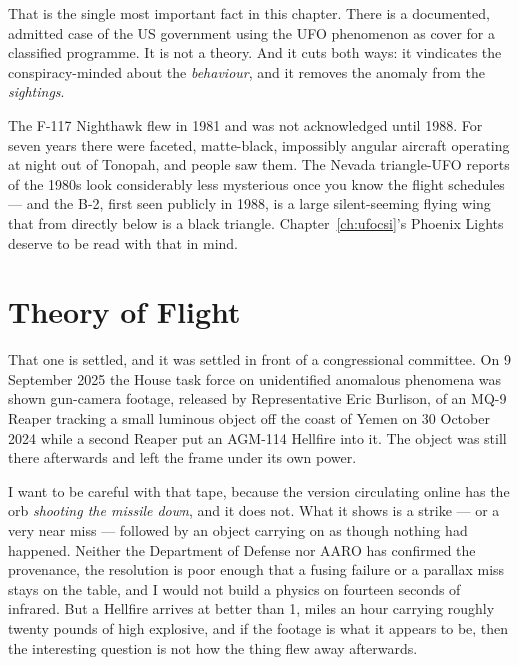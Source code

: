 That is the single most important fact in this chapter. There is a documented, admitted case of
the US government using the UFO phenomenon as cover for a classified programme. It is not a
theory. And it cuts both ways: it vindicates the conspiracy-minded about the \emph{behaviour},
and it removes the anomaly from the \emph{sightings}.

\begin{funfact}
The F-117 Nighthawk flew in 1981 and was not acknowledged until 1988. For seven years there were
faceted, matte-black, impossibly angular aircraft operating at night out of Tonopah, and people
saw them. The Nevada triangle-UFO reports of the 1980s look considerably less mysterious once you
know the flight schedules --- and the B-2, first seen publicly in 1988, is a large silent-seeming
flying wing that from directly below is a black triangle. Chapter~\ref{ch:ufocsi}'s Phoenix Lights deserve to be
read with that in mind.
\end{funfact}

\section{Theory of Flight}\label{sec:theoryflight}

 That one is settled, and
it was settled in front of a congressional committee. On 9 September 2025 the House task force on
unidentified anomalous phenomena was shown gun-camera footage, released by Representative Eric
Burlison, of an MQ-9 Reaper tracking a small luminous object off the coast of Yemen on 30 October
2024 while a second Reaper put an AGM-114 Hellfire into it. The object was still there afterwards
and left the frame under its own power.

I want to be careful with that tape, because the version circulating online has the orb
\emph{shooting the missile down}, and it does not. What it shows is a strike --- or a very near
miss --- followed by an object carrying on as though nothing had happened. Neither the Department
of Defense nor AARO has confirmed the provenance, the resolution is poor enough that a fusing
failure or a parallax miss stays on the table, and I would not build a physics on fourteen seconds
of infrared. But a Hellfire arrives at better than 1, miles an hour carrying roughly twenty
pounds of high explosive, and if the footage is what it appears to be, then the interesting
question is not how the thing flew away afterwards. 

